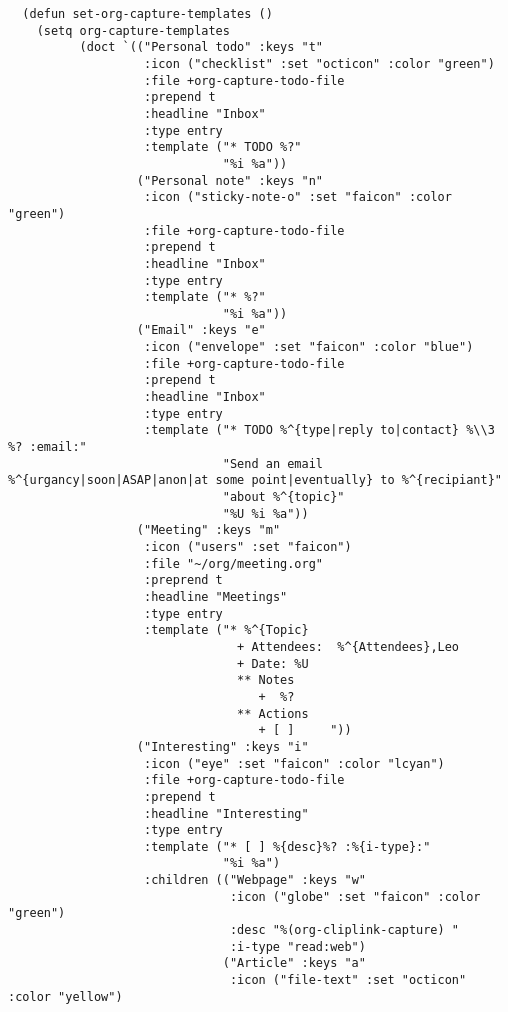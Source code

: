 \documentclass[c]{article}
\theoremstyle{plain}%
\theoremstyle{definition}
\theoremstyle{remark}
\begin{document}
\begin{verbatim}
  (defun set-org-capture-templates ()
    (setq org-capture-templates
          (doct `(("Personal todo" :keys "t"
                   :icon ("checklist" :set "octicon" :color "green")
                   :file +org-capture-todo-file
                   :prepend t
                   :headline "Inbox"
                   :type entry
                   :template ("* TODO %?"
                              "%i %a"))
                  ("Personal note" :keys "n"
                   :icon ("sticky-note-o" :set "faicon" :color "green")
                   :file +org-capture-todo-file
                   :prepend t
                   :headline "Inbox"
                   :type entry
                   :template ("* %?"
                              "%i %a"))
                  ("Email" :keys "e"
                   :icon ("envelope" :set "faicon" :color "blue")
                   :file +org-capture-todo-file
                   :prepend t
                   :headline "Inbox"
                   :type entry
                   :template ("* TODO %^{type|reply to|contact} %\\3 %? :email:"
                              "Send an email %^{urgancy|soon|ASAP|anon|at some point|eventually} to %^{recipiant}"
                              "about %^{topic}"
                              "%U %i %a"))
                  ("Meeting" :keys "m"
                   :icon ("users" :set "faicon")
                   :file "~/org/meeting.org"
                   :preprend t
                   :headline "Meetings"
                   :type entry
                   :template ("* %^{Topic}
                                + Attendees:  %^{Attendees},Leo
                                + Date: %U
                                ** Notes
                                   +  %?
                                ** Actions
                                   + [ ]     "))
                  ("Interesting" :keys "i"
                   :icon ("eye" :set "faicon" :color "lcyan")
                   :file +org-capture-todo-file
                   :prepend t
                   :headline "Interesting"
                   :type entry
                   :template ("* [ ] %{desc}%? :%{i-type}:"
                              "%i %a")
                   :children (("Webpage" :keys "w"
                               :icon ("globe" :set "faicon" :color "green")
                               :desc "%(org-cliplink-capture) "
                               :i-type "read:web")
                              ("Article" :keys "a"
                               :icon ("file-text" :set "octicon" :color "yellow")

\end{verbatim}
\end{document}
